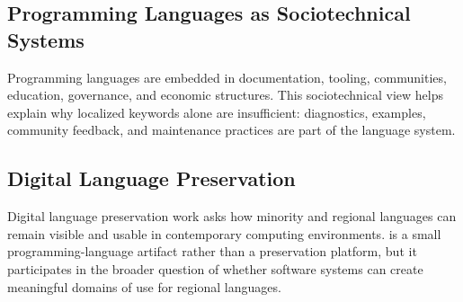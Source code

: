 \subsection{Programming Languages as Sociotechnical Systems}

Programming languages are embedded in documentation, tooling, communities,
education, governance, and economic structures. This sociotechnical view helps
explain why localized keywords alone are insufficient: diagnostics, examples,
community feedback, and maintenance practices are part of the language system.

\citep{todo-pl-sociotechnical}

\subsection{Digital Language Preservation}

Digital language preservation work asks how minority and regional languages can
remain visible and usable in contemporary computing environments. \plat{} is a
small programming-language artifact rather than a preservation platform, but
it participates in the broader question of whether software systems can create
meaningful domains of use for regional languages.

\citep{todo-digital-language-preservation}
